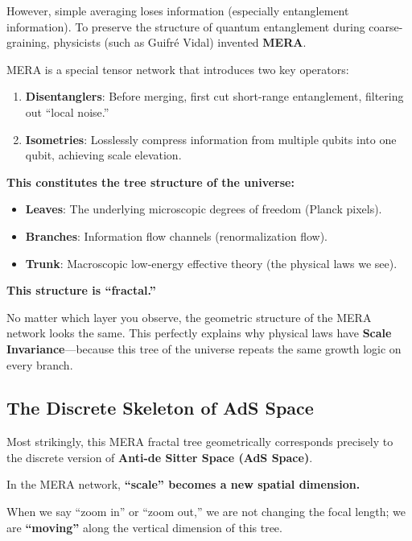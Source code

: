 However, simple averaging loses information (especially entanglement information). To preserve the structure of quantum entanglement during coarse-graining, physicists (such as Guifr\'e Vidal) invented \textbf{MERA}.

MERA is a special tensor network that introduces two key operators:

\begin{enumerate}
\item \textbf{Disentanglers}: Before merging, first cut short-range entanglement, filtering out ``local noise.''

\item \textbf{Isometries}: Losslessly compress information from multiple qubits into one qubit, achieving scale elevation.
\end{enumerate}

\textbf{This constitutes the tree structure of the universe:}

\begin{itemize}
\item \textbf{Leaves}: The underlying microscopic degrees of freedom (Planck pixels).

\item \textbf{Branches}: Information flow channels (renormalization flow).

\item \textbf{Trunk}: Macroscopic low-energy effective theory (the physical laws we see).
\end{itemize}

\textbf{This structure is ``fractal.''}

No matter which layer you observe, the geometric structure of the MERA network looks the same. This perfectly explains why physical laws have \textbf{Scale Invariance}---because this tree of the universe repeats the same growth logic on every branch.

\subsection{The Discrete Skeleton of AdS Space}

Most strikingly, this MERA fractal tree geometrically corresponds precisely to the discrete version of \textbf{Anti-de Sitter Space (AdS Space)}.

In the MERA network, \textbf{``scale'' becomes a new spatial dimension.}

When we say ``zoom in'' or ``zoom out,'' we are not changing the focal length; we are \textbf{``moving''} along the vertical dimension of this tree.

